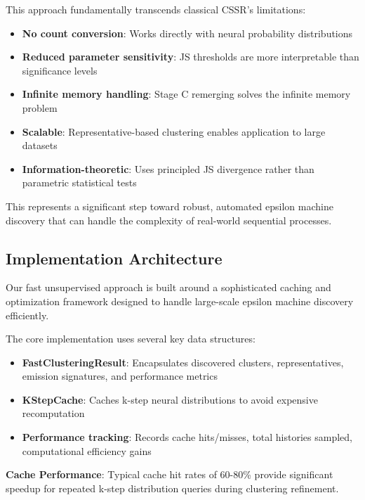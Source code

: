 \documentclass[11pt]{article}
\begin{document}
This approach fundamentally transcends classical CSSR's limitations:

\begin{resultbox}
\begin{itemize}
\item \textbf{No count conversion}: Works directly with neural probability distributions
\item \textbf{Reduced parameter sensitivity}: JS thresholds are more interpretable than significance levels
\item \textbf{Infinite memory handling}: Stage C remerging solves the infinite memory problem
\item \textbf{Scalable}: Representative-based clustering enables application to large datasets
\item \textbf{Information-theoretic}: Uses principled JS divergence rather than parametric statistical tests
\end{itemize}
\end{resultbox}

This represents a significant step toward robust, automated epsilon machine discovery that can handle the complexity of real-world sequential processes.

\subsection{Implementation Architecture}

Our fast unsupervised approach is built around a sophisticated caching and optimization framework designed to handle large-scale epsilon machine discovery efficiently.

\begin{resultbox}
The core implementation uses several key data structures:
\begin{itemize}
\item \textbf{FastClusteringResult}: Encapsulates discovered clusters, representatives, emission signatures, and performance metrics
\item \textbf{KStepCache}: Caches k-step neural distributions to avoid expensive recomputation
\item \textbf{Performance tracking}: Records cache hits/misses, total histories sampled, computational efficiency gains
\end{itemize}

\textbf{Cache Performance}: Typical cache hit rates of 60-80\% provide significant speedup for repeated k-step distribution queries during clustering refinement.
\end{resultbox}
\end{document}
